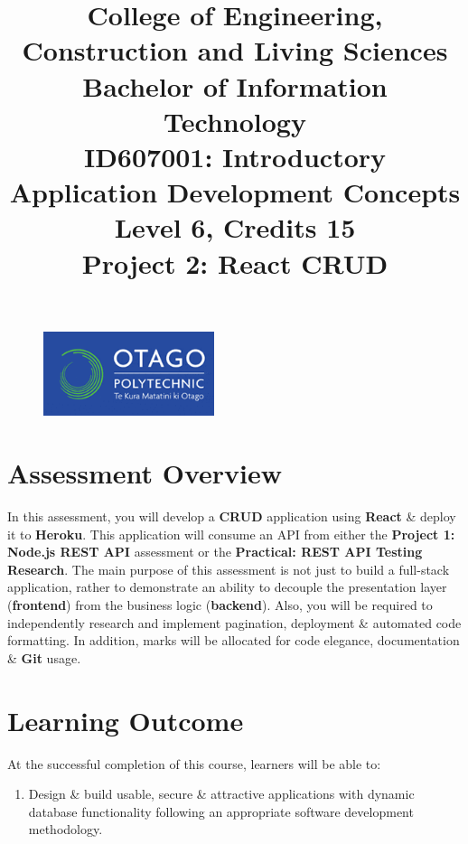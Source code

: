 \documentclass{article}
\author{}
\begin{document}
\begin{figure}
	\centering
	\includegraphics[width=50mm]{../img/logo.png}
\end{figure}

\title{College of Engineering, Construction and Living Sciences\\Bachelor of Information Technology\\ID607001: Introductory Application Development Concepts\\Level 6, Credits 15\\\textbf{Project 2: React CRUD}}
\date{}
\maketitle

\section*{Assessment Overview}
In this assessment, you will develop a \textbf{CRUD} application using \textbf{React} \& deploy it to \textbf{Heroku}. This application will consume an API from either the \textbf{Project 1: Node.js REST API} assessment or the \textbf{Practical: REST API Testing Research}. The main purpose of this assessment is not just to build a full-stack application, rather to demonstrate an ability to decouple the presentation layer (\textbf{frontend}) from the business logic (\textbf{backend}). Also, you will be required to independently research and implement pagination, deployment \& automated code formatting. In addition, marks will be allocated for code elegance, documentation \& \textbf{Git} usage.

\section*{Learning Outcome}
At the successful completion of this course, learners will be able to:
\begin{enumerate}
	\item Design \& build usable, secure \& attractive applications with dynamic database functionality following an appropriate software development methodology.
\end{enumerate}
\end{document}
